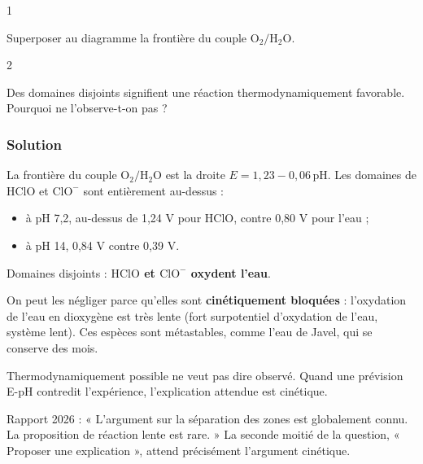 \documentclass[11pt,a4paper]{article}
\providecommand{\tightlist}{\setlength{\itemsep}{0pt}\setlength{\parskip}{0pt}}
\newcommand{\equationajustee}[1]{%
  \sbox{\boiteequation}{$\displaystyle #1$}%
  \ifdim\wd\boiteequation>\linewidth
    \[\resizebox{\linewidth}{!}{\usebox{\boiteequation}}\]%
  \else
    \[#1\]%
  \fi}
\begin{document}
\begin{indication}{1}

Superposer au diagramme la frontière du couple \(\mathrm{O_2/H_2O}\).

\end{indication}

\begin{indication}{2}

Des domaines disjoints signifient une réaction thermodynamiquement favorable. Pourquoi ne l'observe-t-on pas ?

\end{indication}

\hypertarget{solution-22}{%
\subsubsection{Solution}\label{solution-22}}

La frontière du couple \(\mathrm{O_2/H_2O}\) est la droite \(E=1{,}23-0{,}06\,\mathrm{pH}\). Les domaines de \(\mathrm{HClO}\) et \(\mathrm{ClO^-}\) sont entièrement au-dessus :

\begin{itemize}
\tightlist
\item
  à pH 7,2, au-dessus de 1,24 V pour \(\mathrm{HClO}\), contre 0,80 V pour l'eau ;
\item
  à pH 14, 0,84 V contre 0,39 V.
\end{itemize}

Domaines disjoints : \textbf{\(\mathrm{HClO}\) et \(\mathrm{ClO^-}\) oxydent l'eau}.

\equationajustee{2\,\mathrm{HClO}\longrightarrow2\,\mathrm{Cl^-}+\mathrm{O_2}+2\,\mathrm{H^+}}

\equationajustee{2\,\mathrm{ClO^-}\longrightarrow2\,\mathrm{Cl^-}+\mathrm{O_2}}

On peut les négliger parce qu'elles sont \textbf{cinétiquement bloquées} : l'oxydation de l'eau en dioxygène est très lente (fort surpotentiel d'oxydation de l'eau, système lent). Ces espèces sont métastables, comme l'eau de Javel, qui se conserve des mois.

\begin{methode}

Thermodynamiquement possible ne veut pas dire observé. Quand une prévision E-pH contredit l'expérience, l'explication attendue est cinétique.

\end{methode}

\begin{jury}

Rapport 2026 : « L'argument sur la séparation des zones est globalement connu. La proposition de réaction lente est rare. » La seconde moitié de la question, « Proposer une explication », attend précisément l'argument cinétique.

\end{jury}
\end{document}

